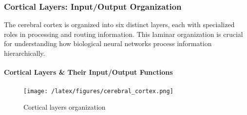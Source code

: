 \subsubsection{Cortical Layers: Input/Output Organization}
\label{subsubsec:cortical-layers}

The cerebral cortex is organized into six distinct layers, each with specialized roles in processing and routing information. This laminar organization is crucial for understanding how biological neural networks process information hierarchically.

\paragraph{Cortical Layers \& Their Input/Output Functions}
\label{para:cortical-layers-functions}

\begin{figure}[h!]
\centering
\texttt{[image: /latex/figures/cerebral\_cortex.png]}
\caption{Cortical layers organization}
\label{fig:cortical-layers}
\end{figure}

